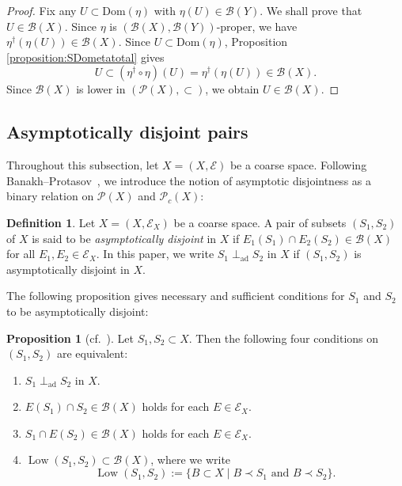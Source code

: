 \documentclass[12pt, a4paper]{amsart}
\theoremstyle{definition}
\newtheorem{proposition}[theorem]{Proposition}
\newtheorem{definition}[theorem]{Definition}
\newcommand{\Low}{\mathop{\mathrm{Low}}\nolimits}
\newcommand{\Dom}{\mathrm{Dom}}
\newcommand{\adperp}{\mathrel{\perp_{\mathrm{ad}}}}
\begin{document}
\begin{proof}
Fix any $U \subset \Dom(\eta)$ with $\eta(U) \in \mathcal{B}(Y)$. We shall prove that $U \in \mathcal{B}(X)$. Since $\eta$ is $(\mathcal{B}(X),\mathcal{B}(Y))$-proper, we have $\eta^\dagger(\eta(U)) \in \mathcal{B}(X)$. Since $U \subset \Dom(\eta)$, Proposition \ref{proposition:SDometatotal} gives
\[
U \subset (\eta^\dagger \circ \eta)(U) = \eta^\dagger(\eta(U)) \in \mathcal{B}(X).
\]
Since $\mathcal{B}(X)$ is lower in $(\mathcal{P}(X),\subset)$, we obtain $U \in \mathcal{B}(X)$.
\end{proof}

\subsection{Asymptotically disjoint pairs}

Throughout this subsection, let $X = (X,\mathcal{E})$ be a coarse space. Following Banakh--Protasov~\cite{BanakhProtasov2018}, we introduce the notion of asymptotic disjointness as a binary relation on $\mathcal{P}(X)$ and $\mathcal{P}_c(X)$:

\begin{definition}\label{definition:AsD}
Let $X = (X,\mathcal{E}_X)$ be a coarse space. A pair of subsets $(S_1,S_2)$ of $X$ is said to be \emph{asymptotically disjoint} in $X$ if $E_1(S_1) \cap E_2(S_2) \in \mathcal{B}(X)$ for all $E_1,E_2 \in \mathcal{E}_X$. In this paper, we write $S_1 \adperp S_2$ in $X$ if $(S_1,S_2)$ is asymptotically disjoint in $X$.
\end{definition}

The following proposition gives necessary and sufficient conditions for $S_1$ and $S_2$ to be asymptotically disjoint:

\begin{proposition}[cf.~{\cite[Corollary~4.2]{GrzegrzolkaSiegertnormal2019}}]
\label{proposition:ADequivcond}
Let $S_1,S_2 \subset X$. Then the following four conditions on $(S_1,S_2)$ are equivalent:
\begin{enumerate}
    \item\label{item:ADequivcond:AD} $S_1 \adperp S_2$ in $X$.
    \item\label{item:ADequivcond:ES1capS2} $E(S_1) \cap S_2 \in \mathcal{B}(X)$ holds for each $E \in \mathcal{E}_X$.
    \item\label{item:ADequivcond:S1capES2} $S_1 \cap E(S_2) \in \mathcal{B}(X)$ holds for each $E \in \mathcal{E}_X$.
    \item\label{item:ADequivcond:commonlowerbound} $\Low(S_1,S_2) \subset \mathcal{B}(X)$,
    where we write 
    \[
    \Low(S_1,S_2) := \{ B \subset X \mid B \prec S_1 \text{ and } B \prec S_2 \}.
    \]
\end{enumerate}
\end{proposition}
\end{document}
